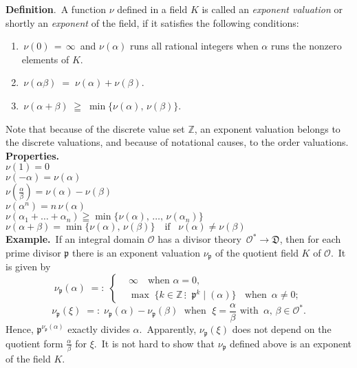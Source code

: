 \documentclass[12pt]{article}
\theoremstyle{definition}
\begin{document}
\textbf{Definition}.\, A function $\nu$ defined in a field $K$ is called an {\em exponent valuation} or shortly an {\em exponent} of the field, if it satisfies the following conditions:
\begin{enumerate}
\item \,$\nu(0) \,=\, \infty$\, and $\nu(\alpha)$ runs all rational integers when $\alpha$ runs the nonzero elements of $K$.
\item \,$\nu(\alpha\beta) \;=\; \nu(\alpha)\!+\!\nu(\beta)$.
\item \,$\nu(\alpha\!+\!\beta) \;\geqq\; \min\{\nu(\alpha),\,\nu(\beta)\}$.\\
\end{enumerate}
Note that because of the discrete value set $\mathbb{Z}$, an exponent valuation belongs to the discrete valuations, and 
because of notational causes, to the order valuations.\\

\textbf{Properties.}\\
$\nu(1) = 0$\\
$\nu(-\alpha) = \nu(\alpha)$\\
$\displaystyle\nu\left(\frac{\alpha}{\beta}\right) = \nu(\alpha)\!-\!\nu(\beta)$\\
$\nu(\alpha^n) = n\,\nu(\alpha)$\\
$\nu(\alpha_1+\ldots+\alpha_n) \geqq \min\{\nu(\alpha),\,\ldots,\,\nu(\alpha_n)\}$\\
$\nu(\alpha\!+\!\beta) = \min\{\nu(\alpha),\,\nu(\beta)\} \quad \mbox{if}\;\;\;\nu(\alpha) \neq \nu(\beta)$\\


\textbf{Example.}\, If an integral domain $\mathcal{O}$ has a divisor theory \,$\mathcal{O}^* \to \mathfrak{D}$, then for each prime divisor $\mathfrak{p}$ there is an exponent valuation $\nu_{\mathfrak{p}}$ of the quotient field $K$ of $\mathcal{O}$.\, It is given by
\[
\nu_{\mathfrak{p}}(\alpha) \;=:\;  
\begin{cases}
& \infty \quad \mbox{when  } \alpha = 0,\\
& \max\;\{k \in \mathbb{Z}\,\vdots\;\; \mathfrak{p}^k \mid (\alpha)\} \;\; \mbox{   when  } \,\alpha \neq 0;
\end{cases} 
\]
$$\nu_{\mathfrak{p}}(\xi) \;=:\; 
\nu_{\mathfrak{p}}(\alpha)-\nu_{\mathfrak{p}}(\beta) \; \mbox{ when }\; 
\xi = \frac{\alpha}{\beta}\mbox{ with }\,\alpha,\,\beta \in \mathcal{O}^*.$$
Hence, $\mathfrak{p}^{\nu_{\mathfrak{p}}(\alpha)}$ exactly divides $\alpha$.\, Apparently, $\nu_{\mathfrak{p}}(\xi)$ does not depend on the quotient form $\frac{\alpha}{\beta}$ for $\xi$.\, It is not hard to show that $\nu_{\mathfrak{p}}$ defined above is an exponent of the field $K$.
\end{document}
